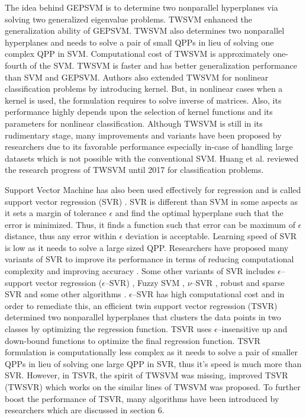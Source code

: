 \documentclass[pdflatex,sn-mathphys]{sn-jnl}%
\theoremstyle{thmstyleone}%
\theoremstyle{thmstyletwo}%
\theoremstyle{thmstylethree}%
\begin{document}
The idea behind GEPSVM is to determine two nonparallel hyperplanes via solving two generalized eigenvalue problems. TWSVM \cite{khemchandani2007twin,TWSVMbook} enhanced the generalization ability of GEPSVM. TWSVM also determines two nonparallel hyperplanes and needs to solve a pair of small QPPs in lieu of solving one complex QPP in SVM. Computational cost of TWSVM is approximately one-fourth of the SVM. TWSVM is faster and has better generalization performance than SVM and GEPSVM. Authors also extended TWSVM for nonlinear classification problems by introducing kernel. But, in nonlinear cases when a kernel is used, the formulation requires to solve inverse of matrices. Also, its performance highly depends upon the selection of kernel functions and its parameters for nonlinear classification. Although TWSVM is still in its rudimentary stage, many improvements and variants have been proposed by researchers due to its favorable performance especially in-case of handling large datasets which is not possible with the conventional SVM. Huang et al. \cite{huang2018twin} reviewed the research progress of TWSVM until 2017 for classification problems.

Support Vector Machine has also been used effectively for regression and is called support vector regression (SVR) \cite{basak2007support}. SVR is different than SVM in some aspects as it sets a margin of tolerance $\epsilon$ and find the optimal hyperplane such that the error is minimized. Thus, it finds a function such that error can be maximum of $\epsilon$ distance, thus any error within $\epsilon$ deviation is acceptable. Learning speed of SVR is low as it needs to solve a large sized QPP. Researchers have proposed many variants of SVR to improve its performance in terms of reducing computational complexity and improving accuracy \cite{drucker1997support, smola2004tutorial}. Some other variants of SVR includes $\epsilon$--support vector regression ($\epsilon$--SVR) \cite{shao2013varepsilon}, Fuzzy SVM \cite{chuang2007fuzzy}, $\nu$--SVR \cite{chang2002training}, robust and sparse SVR \cite{tanveer2016one} and some other algorithms \cite{yang2009localized,elattar2010electric}. $\epsilon$--SVR has high computational cost and in order to remediate this, an efficient twin support vector regression (TSVR) \cite{peng2010tsvr} determined two nonparallel hyperplanes that clusters the data points in two classes by optimizing the regression function. TSVR uses $\epsilon$--insensitive up and down-bound functions to optimize the final regression function. TSVR formulation is computationally less complex as it needs to solve a pair of smaller QPPs in lieu of solving one large QPP in SVR, thus it's speed is much more than SVR. However, in TSVR, the spirit of TWSVM was missing,   improved TSVR (TWSVR) \cite{khemchandani2016twsvr}  which works on the similar lines of TWSVM was proposed. To further boost the performance of TSVR, many algorithms have been introduced by researchers which are discussed in section 6.
\end{document}
